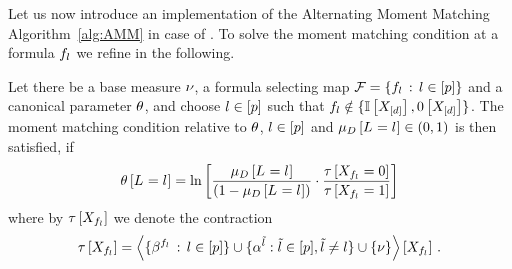 \label{sec:alternatingParEstMLN}

Let us now introduce an implementation of the Alternating Moment Matching Algorithm~\ref{alg:AMM} in case of \MarkovLogicNetworks{}.
To solve the moment matching condition at a formula $f_{l}$ we refine  in the following.

\begin{lemma}
    \label{ref:lemMMinMLN}
    Let there be a base measure $\nu$, a formula selecting map $\mathcal{F}=\{f_{l} \, : \, l\in[p]\}$ and a canonical parameter $\theta$, and choose $l\in[p]$ such that $f_{l}  \notin \{\mathbb{I}\left[X_{[d]}\right],0\left[X_{[d]}\right]\}$.
    The moment matching condition relative to $\theta$, $l\in[p]$ and $\mu_{D}\left[L_{}=l_{}\right]\in(0,1)$ is then satisfied, if
    \begin{align}
        \label{sol:momentMatchingExformula}
        \theta\left[L_{}=l_{}\right] = \ln \left[ 
            \frac{\mu_{D}\left[L_{}=l_{}\right]}{(1-\mu_{D}\left[L_{}=l_{}\right])}
            \cdot \frac{\tau\left[X_{f_{l} }=0\right]}{\tau\left[X_{f_{l} }=1\right]}
         \right]
    \end{align}
    where by $\tau\left[X_{f_{l} }\right]$ we denote the contraction
    \begin{align*}
        \tau\left[X_{f_{l}}\right]
        = \left\langle \{\beta^{f_{l}} \, : \, l\in[p]\}
        \cup\{\alpha^{\tilde{l}} : \tilde{l} \in [p], \tilde{l}\neq l\}
        \cup\{\nu\}\right\rangle \left[ X_{f_{l}} \right] \, .
    \end{align*}
\end{lemma}
